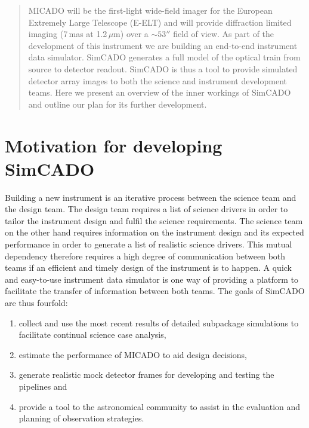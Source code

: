 \documentclass[11pt,twoside]{article}
\begin{document}
\begin{abstract}
MICADO will be the first-light wide-field imager for the European Extremely Large Telescope (E-ELT) and will provide diffraction limited imaging (7\,mas at 1.2\,$\mu$m) over a $\sim 53''$ field of view. As part of the development of this instrument we are building an end-to-end instrument data simulator. SimCADO generates a full model of the optical train from source to detector readout. SimCADO is thus a tool to provide simulated detector array images to both the science and instrument development teams. Here we present an overview of the inner workings of SimCADO and outline our plan for its further development.
\end{abstract}


\section{Motivation for developing SimCADO}
Building a new instrument is an iterative process between the science team and the design team. The design team requires a list of science drivers in order to tailor the instrument design and fulfil the science requirements. The science team on the other hand requires information on the instrument design and its expected performance in order to generate a list of realistic science drivers. This mutual dependency therefore requires a high degree of communication between both teams if an efficient and timely design of the instrument is to happen. A quick and easy-to-use instrument data simulator is one way of providing a platform to facilitate the transfer of information between both teams. The goals of SimCADO are thus fourfold:
\begin{enumerate}
\item collect and use the most recent results of detailed subpackage simulations to facilitate continual science case analysis,
\item estimate the performance of MICADO to aid design decisions,
\item generate realistic mock detector frames for developing and testing the pipelines and
\item provide a tool to the astronomical community to assist in the evaluation and planning of observation strategies.
\end{enumerate}
\end{document}
